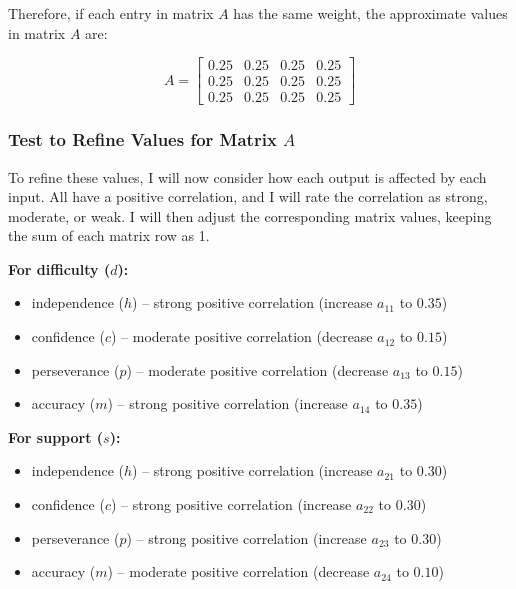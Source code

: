 \documentclass{article}
\begin{document}
        Therefore, if each entry in matrix $A$ has the same weight, the approximate values in matrix $A$ are:

        \[
            A = \begin{bmatrix} 
                0.25 & 0.25 & 0.25 & 0.25 \\
                0.25 & 0.25 & 0.25 & 0.25 \\
                0.25 & 0.25 & 0.25 & 0.25
            \end{bmatrix}
        \]

    \subsubsection{Test to Refine Values for Matrix $A$}

        To refine these values, I will now consider how each output is affected by each input.  All have a positive correlation, and I will rate the correlation as strong, moderate, or weak.  I will then adjust the corresponding matrix values, keeping the sum of each matrix row as 1.

        \textbf{For difficulty ($d$):}
        \begin{itemize}
	        \item independence ($h$) – strong positive correlation (increase $a_{11}$ to $0.35$)
	        \item confidence ($c$) – moderate positive correlation (decrease $a_{12}$ to $0.15$)
	        \item perseverance ($p$) – moderate positive correlation (decrease $a_{13}$ to $0.15$)
	        \item accuracy ($m$) – strong positive correlation (increase $a_{14}$ to $0.35$)
        \end{itemize}

        \textbf{For support ($s$):}
        \begin{itemize}
	        \item independence ($h$) – strong positive correlation (increase $a_{21}$ to $0.30$)
	        \item confidence ($c$) – strong positive correlation (increase $a_{22}$ to $0.30$)
	        \item perseverance ($p$) – strong positive correlation (increase $a_{23}$ to $0.30$)
	        \item accuracy ($m$) – moderate positive correlation (decrease $a_{24}$ to $0.10$)
        \end{itemize}
\end{document}
